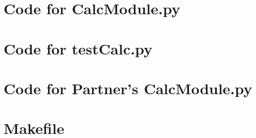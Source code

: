 \documentclass[12pt]{article}
\begin{document}
\newpage

\section{Code for CalcModule.py}

\noindent 

\newpage

\section{Code for testCalc.py}

\noindent 

\newpage

\section{Code for Partner's CalcModule.py}

\noindent 

\newpage

\section{Makefile}
\lstset{language=make}

\noindent 
\end{document}
